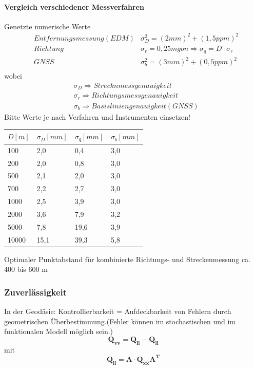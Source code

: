 \documentclass[12pt]{article}
\begin{document}
\paragraph{Vergleich verschiedener Messverfahren}
\noindent Genetzte numerische Werte 
\begin{align*}
&Entfernungsmessung(EDM) &\sigma_D^2 = (2mm)^2 + (1,5ppm)^2 \\
&Richtung  &\sigma_r = 0,25mgon \Rightarrow \sigma_q = D \cdot \sigma_r\\
&GNSS &\sigma_b^2 = (3mm)^2 + (0,5ppm)^2 \\
\end{align*}
wobei
\begin{align*}
& \sigma_D \Rightarrow Strecknmessgenauigkeit \\
& \sigma_r \Rightarrow Richtungsmessgenauigkeit \\
& \sigma_b \Rightarrow Basisliniengenauigkeit (GNSS) 
\end{align*}
Bitte Werte je nach Verfahren und Instrumenten einsetzen! 
\begin{table}[ht]\centering
	\begin{tabular}{|l|l|l|l|}
		\hline
		$D[m]$ & $\sigma_D[mm]$     &   $\sigma_q[mm]$   &  $\sigma_b [mm]$   \\ \hline
		100      & 2,0  & 0,4  & 3,0 \\ \hline
		200      & 2,0  & 0,8  & 3,0 \\ \hline
		500      & 2,1  & 2,0  & 3,0 \\ \hline
		700      & 2,2  & 2,7  & 3,0 \\ \hline
		1000     & 2,5  & 3,9  & 3,0 \\ \hline
		2000     & 3,6  & 7,9  & 3,2 \\ \hline
		5000     & 7,8  & 19,6 & 3,9 \\ \hline
		10000    & 15,1 & 39,3 & 5,8 \\ \hline
	\end{tabular}
\end{table}
Optimaler Punktabstand für kombinierte Richtungs- und Streckenmessung ca. 400 bis 600 m  
\subsubsection{Zuverlässigkeit}
In der Geodäsie: Kontrollierbarkeit = Aufdeckbarkeit von Fehlern durch geometrischen Überbestimmung.(Fehler können im stochastischen und im funktionalen Modell möglich sein.)
\begin{equation*}
\bm{Q_{vv}} = \bm{Q_{ll}} - \bm{Q_{\hat{l}\hat{l}}}
\end{equation*}
mit
\begin{equation*}
\bm{Q_{\hat{l}\hat{l}}} = \bm{A} \cdot \bm{Q_{\hat{x}\hat{x}}} \bm{A^T}
\end{equation*}
\end{document}

